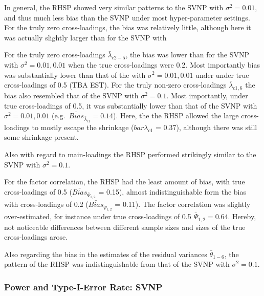 \documentclass[
  english,
  man, donotrepeattitle,floatsintext]{apa6}
\begin{document}
In general, the RHSP showed very similar patterns to the SVNP with \(\sigma^2 = 0.01\), and thus much less bias than the SVNP under most hyper-parameter settings. For the truly zero cross-loadings, the bias was relatively little, although here it was actually slightly larger than for the SVNP with

For the truly zero cross-loadings \(\bar{\lambda}_{c 2-5}\), the bias was lower than for the SVNP with \(\sigma^2 = 0.01, 0.01\) when the true cross-loadings were 0.2. Most importantly bias was substantially lower than that of the with \(\sigma^2 = 0.01, 0.01\) under under true cross-loadings of 0.5 (TBA EST). For the truly non-zero cross-loadings \(\bar{\lambda}_{c 1, 6}\) the bias also resembled that of the SVNP with \(\sigma^2 = 0.1\). Most importantly, under true cross-loadings of 0.5, it was substantially lower than that of the SVNP with \(\sigma^2 = 0.01, 0.01\) (e.g.~\(\bar{Bias}_{\bar{\lambda}_{c 1}} = 0.14\)). Here, the the RHSP allowed the large cross-loadings to mostly escape the shrinkage (\(bar{\lambda}_{c 1}\) = 0.37), although there was still some shrinkage present.

Also with regard to main-loadings the RHSP performed strikingly similar to the SVNP with \(\sigma^2 = 0.1\).

For the factor correlation, the RHSP had the least amount of bias, with true cross-loadings of 0.5 (\(\bar{Bias}_{\bar{\Psi}_{1,2}}\) = 0.15), almost indistinguishable form the bias with cross-loadings of 0.2 (\(\bar{Bias}_{\bar{\Psi}_{1,2}}\) = 0.11). The factor correlation was slightly over-estimated, for instance under true cross-loadings of 0.5 \(\bar{\Psi}_{1,2} = 0.64\). Hereby, not noticeable differences between different sample sizes and sizes of the true cross-loadings arose.

Also regarding the bias in the estimates of the residual variances \(\bar{\theta}_{1-6}\), the pattern of the RHSP was indistinguishable from that of the SVNP with \(\sigma^2 = 0.1\).

\hypertarget{power-and-type-i-error-rate-svnp}{%
\subsubsection{Power and Type-I-Error Rate: SVNP}\label{power-and-type-i-error-rate-svnp}}
\end{document}
